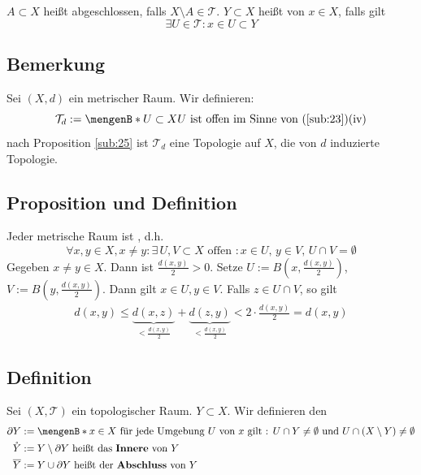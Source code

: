 $A \subset X$ heißt abgeschlossen, falls $X \setminus A  \in \mathcal{T}$. $Y \subset X$ heißt  von $x \in X$, falls gilt
\[
	\exists U \in \mathcal{T} : x \in U \subset Y
\] 

\subsection[Bemerkung über die von einer Metrik induzierte Topologie]{Bemerkung} %
\label{sub:27}
Sei $(X,d)$ ein metrischer Raum. Wir definieren: 
\[
	\mathcal{T}_d := \set[U \subset X]{U \text{ ist offen im Sinne von (\ref{sub:23})(iv)}} 
\]
nach Proposition \ref{sub:25} ist $\mathcal{T}_d$ eine Topologie auf $X$, die von $d$ induzierte Topologie. 

\subsection[Proposition und Definition: Jeder metrische Raum ist Hausdorffsch]{Proposition und Definition} %
\label{sub:28}
Jeder metrische Raum ist , d.h.
\[
	\forall x,y \in X, x \not= y : \exists \, U,V \subset X  \text{ offen } : x \in U, \,  y \in V , \, U \cap V = \emptyset 
\] 
Gegeben $x\not= y \in X$. Dann ist $\frac{d(x,y)}{2} >0$. Setze $U := B(x, \frac{d(x,y)}{2})$, $V:= B(y, \frac{d(x,y)}{2} )$. Dann gilt $x \in U, y \in V$. Falls
$z \in U \cap V$, so gilt
\begin{align*}
	d(x,y) \le \underbrace{d(x,z)}_{< \frac{d(x,y)}{2} }+ \underbrace{d(z,y)}_{< \frac{d(x,y)}{2}} < 2 \cdot \frac{d(x,y)}{2} = d(x,y) \tag*{\light}
\end{align*}
\begin{figure}[h]
\end{figure}

\subsection[Definition Rand, das Innere, der Abschluss]{Definition} %
\label{sub:29}
Sei $(X,\mathcal{T})$ ein topologischer Raum. $Y \subset X$. Wir definieren den  
\begin{align*}
	\partial Y &:= \set[x \in X]{\text{ für jede Umgebung $U$ von $x$ gilt : } U \cap Y \not= \emptyset \text{ und } U \cap (X \setminus Y) \not= \emptyset}  \\
	\mathring{Y} &:= Y \setminus \partial Y \text{ heißt das \Index{Innere} von } Y \\
	\overline{Y} &:= Y \cup \partial Y \text{ heißt der \Index{Abschluss} von }Y
\end{align*}

